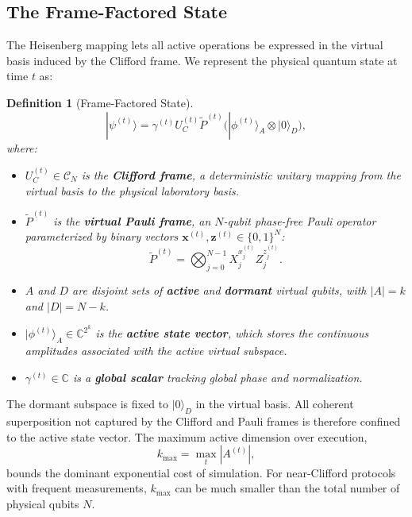 \documentclass[a4paper, onecolumn, unpublished]{quantumarticle}
\newtheorem{definition}{Definition}
\begin{document}
    \subsection{The Frame-Factored State}
    \label{sec:representation}

    The Heisenberg mapping lets all active operations be expressed in the virtual basis induced by the Clifford frame. We represent the physical quantum state at time $t$ as:
    \begin{definition}[Frame-Factored State]
    \label{def:frame_decomposed}
    \begin{equation}
        \label{eq:factored_state}
        |\psi^{(t)}\rangle =
        \gamma^{(t)} U_C^{(t)} \tilde{P}^{(t)}
        \Big( |\phi^{(t)}\rangle_A \otimes |0\rangle_D \Big),
    \end{equation}
    where:
    \begin{itemize}
        \item $U_C^{(t)} \in \mathcal{C}_N$ is the \textbf{Clifford frame}, a deterministic unitary mapping from the virtual basis to the physical laboratory basis.
        \item $\tilde{P}^{(t)}$ is the \textbf{virtual Pauli frame}, an $N$-qubit phase-free Pauli operator parameterized by binary vectors $\mathbf{x}^{(t)}, \mathbf{z}^{(t)} \in \{0,1\}^N$:
        \begin{equation}
            \tilde{P}^{(t)} =
            \bigotimes_{j=0}^{N-1}
            X_j^{x_j^{(t)}} Z_j^{z_j^{(t)}} .
        \end{equation}
        \item $A$ and $D$ are disjoint sets of \textbf{active} and \textbf{dormant} virtual qubits, with $|A|=k$ and $|D|=N-k$.
        \item $|\phi^{(t)}\rangle_A \in \mathbb{C}^{2^k}$ is the \textbf{active state vector}, which stores the continuous amplitudes associated with the active virtual subspace.
        \item $\gamma^{(t)} \in \mathbb{C}$ is a \textbf{global scalar} tracking global phase and normalization.
    \end{itemize}
    \end{definition}

    The dormant subspace is fixed to $|0\rangle_D$ in the virtual basis. All coherent superposition not captured by the Clifford and Pauli frames is therefore confined to the active state vector. The maximum active dimension over execution,
    \begin{equation}
        k_{\max} = \max_t |A^{(t)}|,
    \end{equation}
    bounds the dominant exponential cost of simulation. For near-Clifford protocols with frequent measurements, $k_{\max}$ can be much smaller than the total number of physical qubits $N$.
\end{document}
